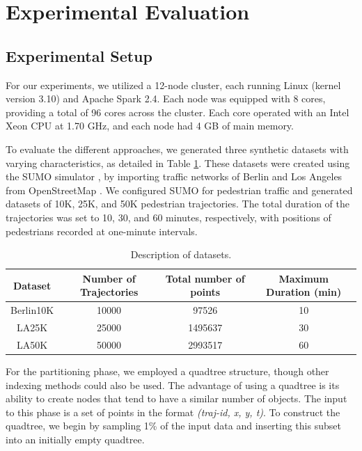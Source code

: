 \section{Experimental Evaluation}
\subsection{Experimental Setup}
For our experiments, we utilized a 12-node cluster, each running Linux (kernel version 3.10) and Apache Spark 2.4. Each node was equipped with 8 cores, providing a total of 96 cores across the cluster. Each core operated with an Intel Xeon CPU at 1.70 GHz, and each node had 4 GB of main memory.

To evaluate the different approaches, we generated three synthetic datasets with varying characteristics, as detailed in Table \ref{tab:datasets}. These datasets were created using the SUMO simulator \cite{krajzewicz_recent_2012}, by importing traffic networks of Berlin and Los Angeles from OpenStreetMap \cite{haklay2008openstreetmap}. We configured SUMO for pedestrian traffic and generated datasets of 10K, 25K, and 50K pedestrian trajectories. The total duration of the trajectories was set to 10, 30, and 60 minutes, respectively, with positions of pedestrians recorded at one-minute intervals.

\begin{table}
    \centering
    \caption{Description of datasets.}\label{tab:datasets}
    \begin{tabular}{cccc}
        \hline
        Dataset & Number of Trajectories & Total number of points & Maximum Duration (min) \\
        \hline
         Berlin10K &  10000 & 97526 & 10\\ 
         LA25K &  25000 & 1495637 & 30\\
         LA50K &  50000 & 2993517 & 60\\
         \hline
    \end{tabular}
\end{table}

For the partitioning phase, we employed a quadtree structure, though other indexing methods could also be used. The advantage of using a quadtree is its ability to create nodes that tend to have a similar number of objects. The input to this phase is a set of points in the format \textit{(traj-id, x, y, t)}. To construct the quadtree, we begin by sampling 1\% of the input data and inserting this subset into an initially empty quadtree.

